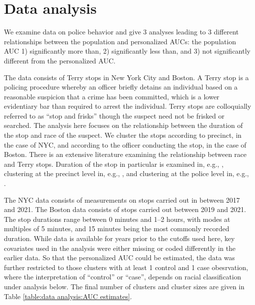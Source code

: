 \documentclass[12pt]{article}
\begin{document}



\section{Data analysis}\label{section:data analysis}

We examine data on police behavior and give 3 analyses leading to 3
different relationships between the population and personalized AUCs:
the population AUC 1) significantly more than, 2) significantly less
than, and 3) not significantly different from the personalized AUC.

The data consists of Terry stops in New York City and Boston. A Terry
stop is a policing procedure whereby an officer  briefly detains an
individual based on a reasonable suspicion that a crime has been
committed, which is a lower evidentiary bar than required to arrest
the individual. Terry stops are colloquially referred to as ``stop and
frisks'' though the suspect need not be frisked or searched. The
analysis here focuses on the relationship between the duration of the
stop and race of the suspect. We cluster the stops according to
precinct, in the case of NYC, and according to the officer conducting
the stop, in the case of Boston. There is an extensive literature
examining the relationship between race and Terry stops. Duration of
the stop in particular is examined in, e.g., \cite{ridgeway2006}, 
clustering at the precinct level in, e.g., \cite{goel2016}, and clustering at the police
level in, e.g., \cite{ridgeway2009}.

The NYC data consists of measurements on
 stops carried out in between 2017
and 2021. The Boston data consists of
 stops carried out between 2019 and
2021. The stop durations range between 0 minutes and 1--2 hours, with modes at multiples of 5
minutes, and 15 minutes being the most commonly recorded duration.  While data is available
for years prior to the cutoffs used here, key covariates used in the
analysis were either missing or coded differently in the earlier
data. So that the personalized AUC could be estimated, the data was
further restricted to those clusters with at least 1 control and 1
case obesrvation, where the interpretation of ``control'' or ``case'',
depends on racial classification under analysis below. The final number of clusters and cluster sizes are
given in Table \ref{table:data analysis:AUC estimates}.
\end{document}
